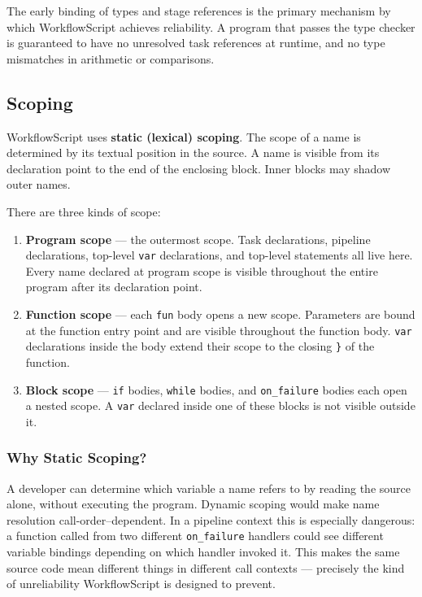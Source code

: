 \documentclass[10pt,a4paper]{article}
\begin{document}
The early binding of types and stage references is the primary mechanism
by which WorkflowScript achieves reliability. A program that passes the
type checker is guaranteed to have no unresolved task references at
runtime, and no type mismatches in arithmetic or comparisons.

\subsection{Scoping}

WorkflowScript uses \textbf{static (lexical) scoping}. The scope of a
name is determined by its textual position in the source. A name is
visible from its declaration point to the end of the enclosing block.
Inner blocks may shadow outer names.

There are three kinds of scope:

\begin{enumerate}
    \item \textbf{Program scope} --- the outermost scope. Task
          declarations, pipeline declarations, top-level \texttt{var}
          declarations, and top-level statements all live here. Every
          name declared at program scope is visible throughout the entire
          program after its declaration point.

    \item \textbf{Function scope} --- each \texttt{fun} body opens a new
          scope. Parameters are bound at the function entry point and are
          visible throughout the function body. \texttt{var} declarations
          inside the body extend their scope to the closing \texttt{\}}
          of the function.

    \item \textbf{Block scope} --- \texttt{if} bodies, \texttt{while}
          bodies, and \texttt{on\_failure} bodies each open a nested
          scope. A \texttt{var} declared inside one of these blocks is
          not visible outside it.
\end{enumerate}

\subsubsection{Why Static Scoping?}

A developer can determine which variable a name refers to by reading the
source alone, without executing the program. Dynamic scoping would make
name resolution call-order--dependent. In a pipeline context this is
especially dangerous: a function called from two different
\texttt{on\_failure} handlers could see different variable bindings
depending on which handler invoked it. This makes the same source code
mean different things in different call contexts --- precisely the kind
of unreliability WorkflowScript is designed to prevent.
\end{document}
